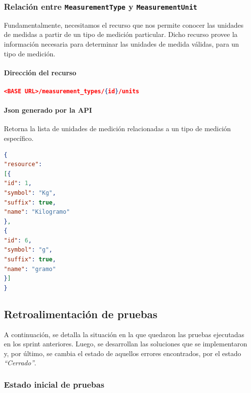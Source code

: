 \subsubsection{Relación entre \texttt{MeasurementType} y \texttt{MeasurementUnit}}

Fundamentalmente, necesitamos el recurso que nos permite conocer las unidades de medidas a partir de un tipo de medición particular.
Dicho recurso provee la información necesaria para determinar las unidades de medida válidas, para un tipo de medición.

\paragraph{Dirección del recurso}
\begin{lstlisting}[language=json,firstnumber=1]
<BASE URL>/measurement_types/{id}/units
\end{lstlisting}

\paragraph{Json generado por la API} 

Retorna la lista de unidades de medición relacionadas a un tipo de medición específico.

\begin{lstlisting}[language=json, caption=Json generado por la api, label=unitPeso]
{
"resource": 
[{
"id": 1,
"symbol": "Kg",
"suffix": true,
"name": "Kilogramo"
},
{
"id": 6,
"symbol": "g",
"suffix": true,
"name": "gramo"
}]
}
\end{lstlisting}


\subsection{Retroalimentación de pruebas}

A continuación, se detalla la situación en la que quedaron las pruebas ejecutadas en los sprint anteriores.
Luego, se desarrollan las soluciones que se implementaron y, por último, se cambia el estado de aquellos errores encontrados, por el estado \textit{``Cerrado''}.

\subsubsection{Estado inicial de pruebas}

